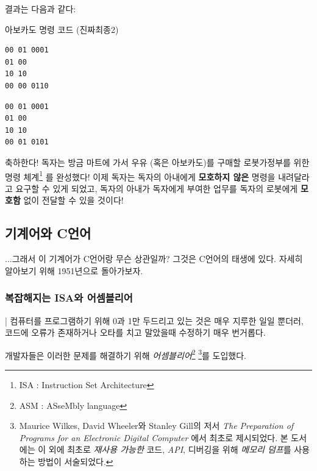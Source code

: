 \documentclass{article}
\begin{document}
결과는 다음과 같다:

\begin{center}

    \centering
    
    아보카도 명령 코드 (진짜최종2)

    \begin{minipage}{0.45\textwidth}
        \begin{lstlisting}[escapeinside=``]
00 01 0001
01 00
10 10
00 00 0110
        \end{lstlisting}
    \end{minipage}
    \hfill
    \begin{minipage}{0.45\textwidth}
        \begin{lstlisting}[escapeinside=``]
00 01 0001
01 00
10 10
00 01 0101
        \end{lstlisting}
    \end{minipage}

\end{center}

축하한다! 독자는 방금 마트에 가서 우유 (혹은 아보카도)를 구매할
로봇가정부를 위한 명령 체계\footnote{ISA : Instruction Set Architecture}
를 완성했다!
이제 독자는 독자의 아내에게 \textbf{모호하지 않은} 명령을 내려달라고
요구할 수 있게 되었고, 독자의 아내가 독자에게 부여한 업무를 독자의
로봇에게 \textbf{모호함} 없이 전달할 수 있을 것이다!

\subsection{기계어와 C언어}

...그래서 이 기계어가 C언어랑 무슨 상관일까?
그것은 C언어의 태생에 있다.
자세히 알아보기 위해 1951년으로 돌아가보자.

\subsubsection{복잡해지는 ISA와 어셈블리어}

| 컴퓨터를 프로그램하기 위해 0과 1만 두드리고 있는 것은
매우 지루한 일일 뿐더러, 코드에 오류가 존재하거나 오타를 치고 말았을때
수정하기 매우 번거롭다.

개발자들은 이러한 문제를 해결하기 위해
\textit{어셈블리어}\footnote{ASM : ASseMbly language}
\footnote{
    Maurice Wilkes, David Wheeler와 Stanley Gill의 저서
    \textit{The Preparation of Programs for an Electronic Digital Computer}
    에서 최초로 제시되었다.
    본 도서에는 이 외에 최초로 \textit{재사용 가능한} 코드, \textit{API},
    디버깅을 위해 \textit{메모리 덤프}를 사용하는 방법이 서술되었다.
}를 도입했다. 
\end{document}
